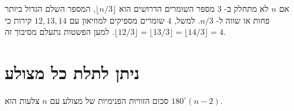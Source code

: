 אם
$n$
לא מתחלק ב-%
$3$
מספר השומרים הדרושים הוא
$\lfloor n/3\rfloor$, 
המספר השלם הגדול ביותר פחות או שווה ל-%
$n/3$.
למשל, 
$4$
שומרים מספיקים למוזיאון עם 
$12, 13, 14$
קירות כי
$\lfloor 12/3\rfloor =\lfloor 13/3\rfloor=\lfloor 14/3\rfloor=4$. 
למען הפשטות נתעלם מסיבוך זה.


\section{ניתן לתלת כל מצולע}\label{s.museum-triangulated}

\begin{theorem}\label{thm.interior-angles-of-a-polygon}
סכום הזוויות הפנימיות של מצולע עם
$n$
צלעות הוא
$180^\circ(n-2)$.
\end{theorem}

